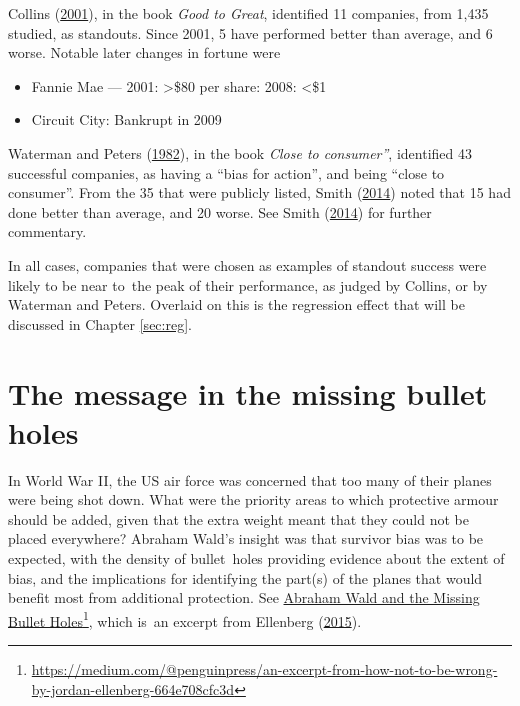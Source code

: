 \documentclass[
  10ptls,
  b5paper]{book}
\providecommand{\tightlist}{%
  \setlength{\itemsep}{0pt}\setlength{\parskip}{0pt}}
\begin{document}
Collins (\protect\hyperlink{ref-collins_2001}{2001}), in the book \emph{Good to Great}, identified
11 companies, from 1,435 studied, as standouts. Since 2001,
5 have performed better than average, and 6 worse.
Notable later changes in fortune were

\begin{itemize}
\tightlist
\item
  Fannie Mae --- 2001: \textgreater\$80 per share: 2008: \textless\$1
\item
  Circuit City: Bankrupt in 2009
\end{itemize}

Waterman and Peters (\protect\hyperlink{ref-waterman1982search}{1982}), in the book \emph{Close to consumer''},
identified 43 successful companies, as having a ``bias for action'',
and being ``close to consumer''. From the 35 that were publicly listed,
Smith (\protect\hyperlink{ref-smith-sd}{2014}) noted that 15 had done better than average, and 20 worse.
See Smith (\protect\hyperlink{ref-smith-sd}{2014}) for further commentary.

In all cases, companies that were chosen as examples of
standout success were likely to be near to~the peak of
their performance, as judged by Collins, or by Waterman and Peters.
Overlaid on this is the regression effect that will be discussed
in Chapter \ref{sec:reg}.

\hypertarget{ss:wald}{%
\section{The message in the missing bullet holes}\label{ss:wald}}

In World War II, the US air force was concerned that too many
of their planes were being shot down. What were the priority
areas to which protective armour should be added, given that
the extra weight meant that they could not be placed everywhere?
Abraham Wald's insight was that survivor bias was to be
expected, with the density of bullet~holes providing evidence
about the extent of bias, and the implications for identifying
the part(s) of the planes that would benefit most from
additional protection. See \href{https://medium.com/@penguinpress/an-excerpt-from-how-not-to-be-wrong-by-jordan-ellenberg-664e708cfc3d}{Abraham Wald and the Missing Bullet Holes}\footnote{\url{https://medium.com/@penguinpress/an-excerpt-from-how-not-to-be-wrong-by-jordan-ellenberg-664e708cfc3d}},
which is~an excerpt from Ellenberg (\protect\hyperlink{ref-ellenberg_2015}{2015}).
\end{document}
